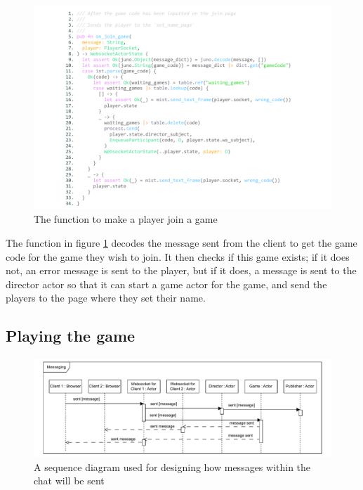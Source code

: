 \documentclass[]{final}
\begin{document}
\newpage

\begin{figure}[H]
  \centering
  \includegraphics[width=\textwidth]{on_join_game.pdf}
  \caption{The function to make a player join a game}\label{fig: onjoingame}
\end{figure}

The function in figure \ref{fig: onjoingame} decodes the message sent from the client to
get the game code for the game they wish to join. It then checks if this game
exists; if it does not, an error message is sent to the player, but if it does,
a message is sent to the director actor so that it can start a game actor for the game,
and send the players to the page where they set their name.

\newpage

\subsection{Playing the game}

\begin{figure}[H]
  \centering
  \includegraphics[width=0.9\linewidth]{sequence_messaging}
  \caption{A sequence diagram used for designing how messages within the chat will be sent}
\end{figure}
\end{document}
